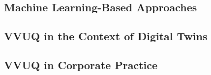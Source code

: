\subsection{Machine Learning-Based Approaches}

\subsection{VVUQ in the Context of Digital Twins}

\subsection{VVUQ in Corporate Practice}



